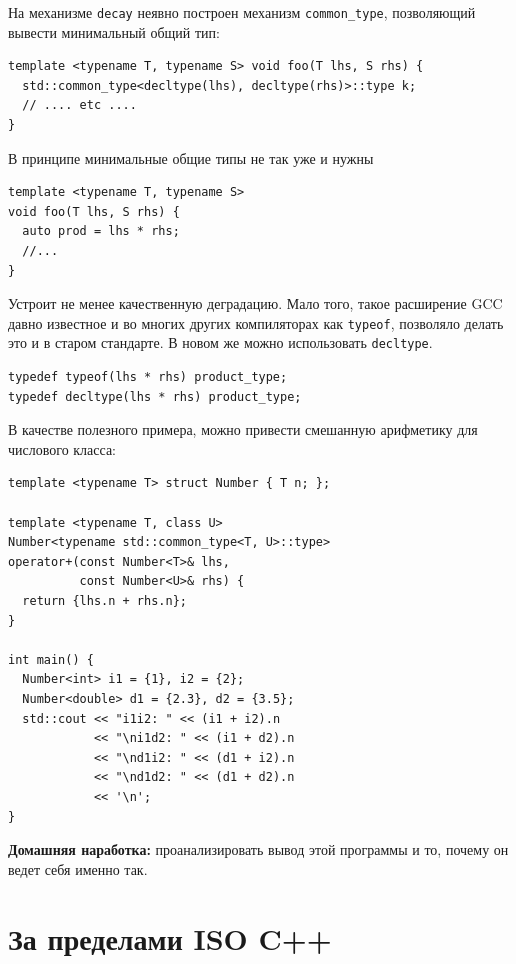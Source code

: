 \documentclass[a4paper,12pt,oneside]{book}
\newif\ifoutreach
\begin{document}
На механизме \lstinline!decay! неявно построен механизм \lstinline!common_type!, позволяющий вывести минимальный общий тип:

\begin{lstlisting}
template <typename T, typename S> void foo(T lhs, S rhs) {
  std::common_type<decltype(lhs), decltype(rhs)>::type k;
  // .... etc ....
}
\end{lstlisting}

В принципе минимальные общие типы не так уже и нужны

\begin{lstlisting}
template <typename T, typename S>
void foo(T lhs, S rhs) {
  auto prod = lhs * rhs;
  //...
}
\end{lstlisting}

Устроит не менее качественную деградацию. Мало того, такое расширение GCC давно известное и во многих других компиляторах как \lstinline!typeof!, позволяло делать это и в старом стандарте. В новом же можно использовать \lstinline!decltype!.

\begin{lstlisting}
typedef typeof(lhs * rhs) product_type;
typedef decltype(lhs * rhs) product_type;
\end{lstlisting}

В качестве полезного примера, можно привести смешанную арифметику для числового класса:

\begin{lstlisting}
template <typename T> struct Number { T n; };
 
template <typename T, class U>
Number<typename std::common_type<T, U>::type> 
operator+(const Number<T>& lhs,
          const Number<U>& rhs) {
  return {lhs.n + rhs.n};
}
 
int main() {
  Number<int> i1 = {1}, i2 = {2};
  Number<double> d1 = {2.3}, d2 = {3.5};
  std::cout << "i1i2: " << (i1 + i2).n 
            << "\ni1d2: " << (i1 + d2).n 
            << "\nd1i2: " << (d1 + i2).n 
            << "\nd1d2: " << (d1 + d2).n 
            << '\n';
}
\end{lstlisting}

\textbf{Домашняя наработка:} проанализировать вывод этой программы и то, почему он ведет себя именно так.

\ifoutreach
\section{За пределами ISO C++}\label{subsec:outborders}
\end{document}
